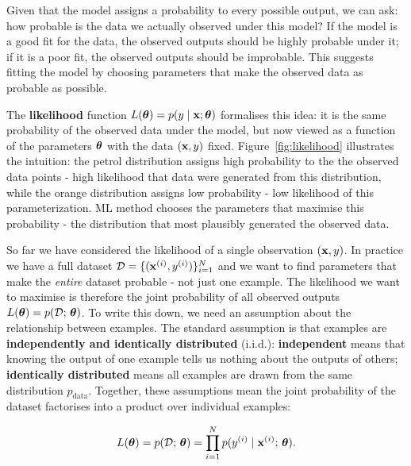 Given that the model assigns a probability to every possible output, we can ask: how probable is the data we actually observed under this model? If the model is a good fit for the data, the observed outputs should be highly probable under it; if it is a poor fit, the observed outputs should be improbable. This suggests fitting the model by choosing parameters that make the observed data as probable as possible.

The \textbf{likelihood} function $L(\boldsymbol{\theta}) = p(y \mid \mathbf{x}; \boldsymbol{\theta})$ formalises this idea: it is the same probability of the observed data under the model, but now viewed as a function of the parameters $\boldsymbol{\theta}$ with the data $(\mathbf{x}, y)$ fixed. Figure~\ref{fig:likelihood} illustrates the intuition: the petrol distribution assigns high probability to the the observed data points - high likelihood that data were generated from this distribution, while the orange distribution assigns low probability - low likelihood of this parameterization. ML method chooses the parameters that maximise this probability - the distribution that most plausibly generated the observed data.

So far we have considered the likelihood of a single observation $(\mathbf{x}, y)$. In practice we have a full dataset $\mathcal{D} = \{(\mathbf{x}^{(i)}, y^{(i)})\}_{i=1}^{N}$ and we want to find parameters that make the \emph{entire} dataset probable - not just one example. The likelihood we want to maximise is therefore the joint probability of all observed outputs $L(\boldsymbol{\theta}) = p(\mathcal{D};\, \boldsymbol{\theta})$. To write this down, we need an assumption about the relationship between examples. The standard assumption is that examples are \textbf{independently and identically distributed} (i.i.d.): \textbf{independent} means that knowing the output of one example tells us nothing about the outputs of others; \textbf{identically distributed} means all examples are drawn from the same distribution $p_{\text{data}}$. Together, these assumptions mean the joint probability of the dataset factorises into a product over individual examples:

\begin{equation}
    L(\boldsymbol{\theta}) = p(\mathcal{D};\, \boldsymbol{\theta}) = \prod_{i=1}^{N} p(y^{(i)} \mid \mathbf{x}^{(i)};\, \boldsymbol{\theta}).
\end{equation}

